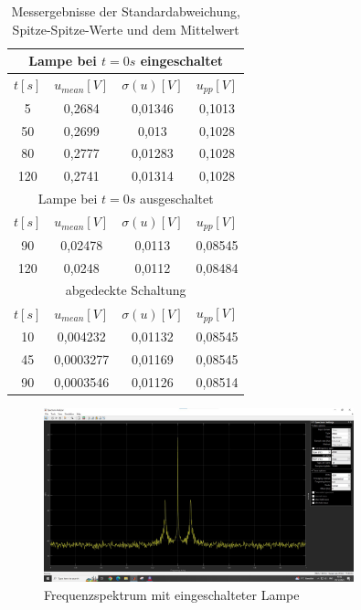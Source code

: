 \documentclass[a4paper]{article}
\begin{document}
\begin{table}[h]
    \centering
    \caption{Messergebnisse der Standardabweichung, Spitze-Spitze-Werte und dem Mittelwert}
    \label{tab:6-3-4}
    \begin{tabular}{|c|c|c|c|}
        \hline
        \multicolumn{4}{|c|}{Lampe bei $t=0\unit{s}$ eingeschaltet}\\
        \hline
        $t\unit{[s]}$ & $u_{mean}\unit{[V]}$ & $\sigma(u)\unit{[V]}$ &  $u_{pp}\unit{[V]}$ \\
        \hline
        5&0,2684&0,01346&0,1013\\
        50 & 0,2699& 0,013 & 0,1028\\
        80 & 0,2777 & 0,01283 & 0,1028\\
        120 & 0,2741 & 0,01314 & 0,1028\\
        \hline
        \hline
        \multicolumn{4}{|c|}{Lampe bei $t=0\unit{s}$ ausgeschaltet}\\
        \hline
        $t\unit{[s]}$ & $u_{mean}\unit{[V]}$ & $\sigma(u)\unit{[V]}$ &  $u_{pp}\unit{[V]}$ \\
        \hline
        90 & 0,02478 & 0,0113 & 0,08545\\
        120 & 0,0248 & 0,0112 & 0,08484\\
        \hline
        \hline
        \multicolumn{4}{|c|}{abgedeckte Schaltung}\\
        \hline
        $t\unit{[s]}$ & $u_{mean}\unit{[V]}$ & $\sigma(u)\unit{[V]}$ &  $u_{pp}\unit{[V]}$ \\
        \hline
        10 & 0,004232 & 0,01132 & 0,08545\\
        45 & 0,0003277 & 0,01169 & 0,08545\\
        90 & 0,0003546 & 0,01126 & 0,08514\\
        \hline
    \end{tabular}
\end{table}
\begin{figure}[h]
    \centering
    \includegraphics[width=0.8\textwidth]{images/6.3.4)mit_lampe.jpg}
    \caption{Frequenzspektrum mit eingeschalteter Lampe}
    \label{fig:6-3-4-mitLA1}
\end{figure}
\end{document}
